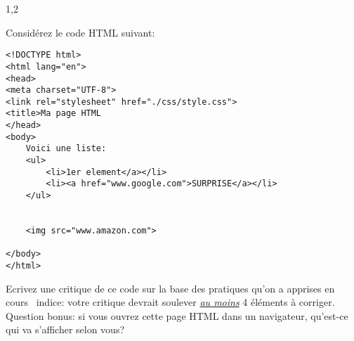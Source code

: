 \documentclass[11pt,a4paper]{exam}
\begin{document}
\begin{questions}
\begin{spacing}{1,2}
        
        \question[4] Considérez le code HTML suivant:
            \begin{verbatim}
<!DOCTYPE html>
<html lang="en">
<head>
<meta charset="UTF-8">
<link rel="stylesheet" href="./css/style.css">
<title>Ma page HTML
</head>
<body>
    Voici une liste:
    <ul>
        <li>1er element</a></li>
        <li><a href="www.google.com">SURPRISE</a></li>
    </ul>


    <img src="www.amazon.com">

</body>
</html>
            \end{verbatim}
            Ecrivez une critique de ce code sur la base des pratiques qu'on a apprises en 
            cours \textemdash\ indice: votre critique devrait soulever \uline{\textit{au moins}} 
            4 éléments à corriger.
            \\
            Question bonus: si vous ouvrez cette page HTML dans un navigateur, qu'est-ce 
            qui va s'afficher selon vous?
        \end{spacing}
    \end{questions}
\end{document}
